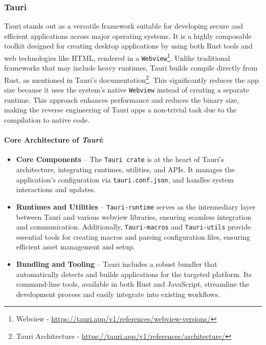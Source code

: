 \subsubsection{Tauri}
\label{theory:tauri}
Tauri stands out as a versatile framework suitable for developing secure and efficient applications across major operating systems. It is a highly composable toolkit designed for creating desktop applications by using both Rust tools and web technologies like HTML, rendered in a \texttt{Webview}\footnote{Webview - \url{https://tauri.app/v1/references/webview-versions/}}. Unlike traditional frameworks that may include heavy runtimes, Tauri builds compile directly from Rust, as mentioned in {Tauri's documentation}\footnote{Tauri Architecture - \url{https://tauri.app/v1/references/architecture/}}. This significantly reduces the app size because it uses the system's native \texttt{Webview} instead of creating a separate runtime. This approach enhances performance and reduces the binary size, making the reverse engineering of Tauri apps a non-trivial task due to the compilation to native code.

\paragraph{Core Architecture of \textit{Tauri}:}
\begin{itemize}
    \item \textbf{Core Components} -- The \texttt{Tauri crate} is at the heart of Tauri's architecture, integrating runtimes, utilities, and APIs. It manages the application's configuration via \texttt{tauri.conf.json}, and handles system interactions and updates.

    \item \textbf{Runtimes and Utilities} -- \texttt{Tauri-runtime} serves as the intermediary layer between Tauri and various webview libraries, ensuring seamless integration and communication. Additionally, \texttt{Tauri-macros} and \texttt{Tauri-utils} provide essential tools for creating macros and parsing configuration files, ensuring efficient asset management and setup.

    \item \textbf{Bundling and Tooling} -- Tauri includes a robust bundler that automatically detects and builds applications for the targeted platform. Its command-line tools, available in both Rust and JavaScript, streamline the development process and easily integrate into existing workflows.
\end{itemize}


